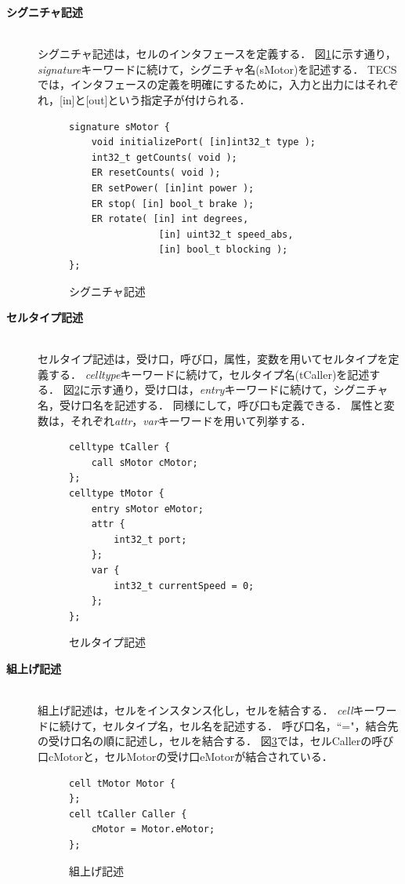 \documentclass[submit,techrep]{ipsj_v2/UTF8/ipsj}
\begin{document}
\begin{description}
    \item[{\bf シグニチャ記述}]\mbox{}\\
        シグニチャ記述は，セルのインタフェースを定義する．
        図\ref{signature}に示す通り，{\it signature}キーワードに続けて，シグニチャ名(sMotor)を記述する．
        TECSでは，インタフェースの定義を明確にするために，入力と出力にはそれぞれ，[in]と[out]という指定子が付けられる．
        
\begin{figure}[t]
\centering
\begin{lstlisting}
signature sMotor {
    void initializePort( [in]int32_t type );
    int32_t getCounts( void );
    ER resetCounts( void );
    ER setPower( [in]int power );
    ER stop( [in] bool_t brake );
    ER rotate( [in] int degrees,
                [in] uint32_t speed_abs,
                [in] bool_t blocking );
};
\end{lstlisting}
\caption{シグニチャ記述}
\label{signature}
\end{figure}

    \item[{\bf セルタイプ記述}]\mbox{}\\
        セルタイプ記述は，受け口，呼び口，属性，変数を用いてセルタイプを定義する．
        {\it celltype}キーワードに続けて，セルタイプ名(tCaller)を記述する．
        図\ref{celltype}に示す通り，受け口は，{\it entry}キーワードに続けて，シグニチャ名，受け口名を記述する．
        同様にして，呼び口も定義できる．
        属性と変数は，それぞれ{\it attr}，{\it var}キーワードを用いて列挙する．

\begin{figure}[t]
\centering
\begin{lstlisting}
celltype tCaller {
    call sMotor cMotor;
};
celltype tMotor {
    entry sMotor eMotor;
    attr {
        int32_t port;
    };
    var {
        int32_t currentSpeed = 0;
    };
};
\end{lstlisting}
\caption{セルタイプ記述}  
\label{celltype}
\end{figure}

    \item[{\bf 組上げ記述}]\mbox{}\\
        組上げ記述は，セルをインスタンス化し，セルを結合する．
        {\it cell}キーワードに続けて，セルタイプ名，セル名を記述する．
        呼び口名，``="，結合先の受け口名の順に記述し，セルを結合する．
        図\ref{build}では，セルCallerの呼び口cMotorと，セルMotorの受け口eMotorが結合されている．
        
\begin{figure}[t]
\centering
\begin{lstlisting}
cell tMotor Motor {
};
cell tCaller Caller {
    cMotor = Motor.eMotor;
};
\end{lstlisting}
\caption{組上げ記述}
\label{build}
\end{figure}

\end{description}
\end{document}
